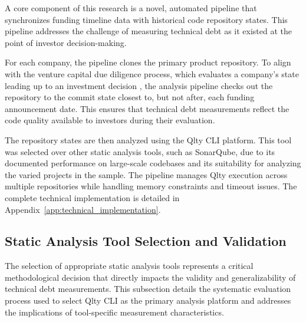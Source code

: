 A core component of this research is a novel, automated pipeline that synchronizes funding timeline data with historical code repository states. This pipeline addresses the challenge of measuring technical debt as it existed at the point of investor decision-making.

For each company, the pipeline clones the primary product repository. To align with the venture capital due diligence process, which evaluates a company's state leading up to an investment decision \cite{sahlman1990structure}, the analysis pipeline checks out the repository to the commit state closest to, but not after, each funding announcement date. This ensures that technical debt measurements reflect the code quality available to investors during their evaluation.

The repository states are then analyzed using the Qlty CLI platform. This tool was selected over other static analysis tools, such as SonarQube, due to its documented performance on large-scale codebases and its suitability for analyzing the varied projects in the sample. The pipeline manages Qlty execution across multiple repositories while handling memory constraints and timeout issues. The complete technical implementation is detailed in Appendix~\ref{app:technical_implementation}.

\subsection{Static Analysis Tool Selection and Validation}

The selection of appropriate static analysis tools represents a critical methodological decision that directly impacts the validity and generalizability of technical debt measurements. This subsection details the systematic evaluation process used to select Qlty CLI as the primary analysis platform and addresses the implications of tool-specific measurement characteristics.

